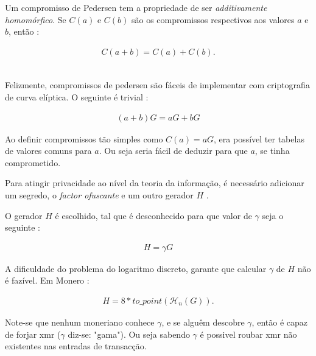 Um compromisso de Pedersen tem a propriedade de ser {\em additivamente homomórfico}. 
Se \(C(a)\) e \(C(b)\) são os compromissos respectivos aos valores \(a\) e \(b\), então :

\begin{align*}
C(a + b) = C(a) + C(b) . 
\end{align*}

\\
Felizmente, compromissos de pedersen são fáceis de implementar com criptografia de curva elíptica. O seguinte é trivial : 

\begin{align*}
(a + b) G = a G + b G 
\end{align*}

Ao definir compromissos tão simples como \(C(a) = a G\), era possível ter tabelas de valores comuns para $a$. Ou seja seria fácil de deduzir para que $a$, se tinha comprometido. 

Para atingir privacidade ao nível da teoria da informação, é necessário adicionar um segredo, o {\em factor ofuscante} e um outro gerador \(H\) .

O gerador \(H\) é escolhido, tal que é desconhecido para que valor de \(\gamma\) seja o seguinte :

\begin{align*}
H = \gamma G
\end{align*}

A dificuldade do problema do logaritmo discreto, garante que calcular $\gamma$ de $H$ não é fazível.
Em Monero :

\begin{align*}
H = 8*to\_point(\mathcal{H}_n(G)).
\end{align*}

Note-se que nenhum moneriano conhece $\gamma$, e se alguêm descobre $\gamma$, então é capaz de forjar xmr ($\gamma$ diz-se: "gama"). Ou seja sabendo $\gamma$ é possivel roubar xmr não existentes nas entradas de transacção.



